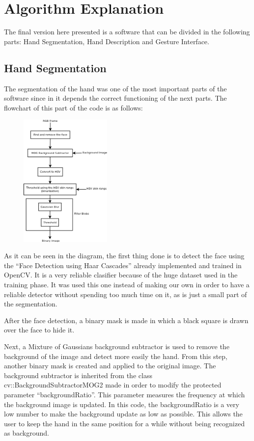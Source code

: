 \section{Algorithm Explanation}

The final version here presented is a software that can be divided in the following parts: Hand Segmentation, Hand Description and Gesture Interface.

\subsection{Hand Segmentation}
The segmentation of the hand was one of the most important parts of the software since in it depends the correct functioning of the next parts. 
The flowchart of this part of the code is as follows: 

\begin{figure}[H]
	\centering
	 \includegraphics[width=0.4\textwidth]{../images/hand_filter.png} 
\end{figure}
 
As it can be seen in the diagram, the first thing done is to detect the face using the ``Face Detection using Haar Cascades'' already implemented and trained in OpenCV. It is a very reliable clasifier because of the huge dataset used in the training phase. It was used this one instead of making our own in order to have a reliable detector without spending too much time on it, as is just a small part of the segmentation. 


After the face detection, a binary mask is made in which a black square is drawn over the face to hide it.

Next, a Mixture of Gaussians background subtractor is used to remove the background of the image and detect more easily the hand. From this step, another binary mask is created and applied to the original image. 
The background subtractor is inherited from the class cv::BackgroundSubtractorMOG2 made in order to modify the protected parameter ``backgroundRatio''. This parameter measures the frequency at which the background image is updated. In this code, the backgroundRatio is a very low number to make the background update as low as possible. This allows the user to keep the hand in the same position for a while without being recognized as background.  

